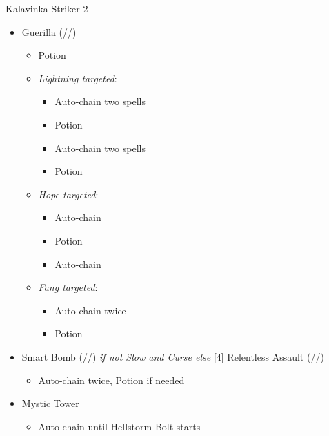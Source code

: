 \begin{multicols}{2}
  \renewcommand{\first}{[1] Guerilla (\rav/\syn/\sab)}
  \renewcommand{\second}{[2] Smart Bomb (\rav/\rav/\sab)}
  \renewcommand{\third}{[3] Mystic Tower}
  \renewcommand{\fourth}{[4] Relentless Assault (\rav/\rav/\com)}
  \renewcommand{\fifth}{[5] Aggression (\com/\rav/\com)}
  \begin{battle}{Kalavinka Striker 2}
    \begin{itemize}
      \item \first
            \begin{itemize}
              \item Potion
              \item \textit{Lightning targeted}:
                    \begin{itemize}
                      \item Auto-chain two spells
                      \item Potion
                      \item Auto-chain two spells
                      \item Potion
                    \end{itemize}
              \item \textit{Hope targeted}:
                    \begin{itemize}
                      \item Auto-chain
                      \item Potion
                      \item Auto-chain
                    \end{itemize}
              \item \textit{Fang targeted}:
                    \begin{itemize}
                      \item Auto-chain twice
                      \item Potion
                    \end{itemize}
            \end{itemize}
      \item \second \textit{ if not Slow and Curse else} \fourth
            \begin{itemize}
              \item Auto-chain twice, Potion if needed
            \end{itemize}
      \item \third
            \begin{itemize}
              \item Auto-chain until Hellstorm Bolt starts

\end{itemize}
\end{itemize}
\end{battle}
\end{multicols}
